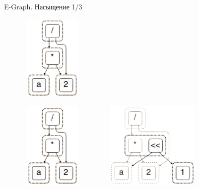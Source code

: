 \documentclass[aspectratio=169
  , xcolor={svgnames}
  , russian  %
  ]{beamer}
\begin{document}
\begin{frame}{E-Graph. Насыщение 1/3}
    {
        \begin{center}
            \includegraphics[width=5.2cm, height=4.2cm]{misc/egraphs_images/egraph_1.png}
        \end{center}
    }
    {
        \begin{center}
            \includegraphics[width=5.2cm, height=4.2cm]{misc/egraphs_images/egraph_1.png}
            \hspace{0.5cm}
            \hspace{0.5cm}
            \includegraphics[width=5.2cm, height=4.2cm]{misc/egraphs_images/egraph_2.jpg}
        \end{center}
    }
\end{frame}
\end{document}
